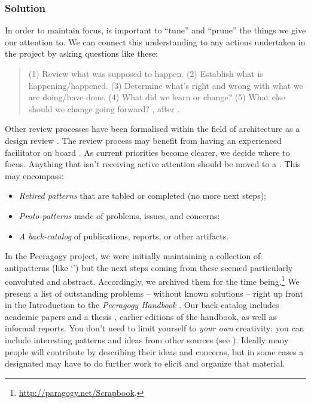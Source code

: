 \subsubsection*{Solution}
In order to maintain focus, is important to ``tune'' and ``prune'' the
things we give our attention to.  We can connect this understanding to
any actions undertaken in the project by asking questions like these:
\begin{quote}
(1) Review what was supposed to happen.
(2) Establish what is happening/happened.
(3) Determine what’s right and wrong with what we are doing/have done.
(4) What did we learn or change? 
(5) What else should we change going forward?  \cite[Chapter 28]{peeragogy-handbook}, after \cite{afteraction}.
\end{quote}
%
Other review processes have been formalised within the field of architecture
as a design review \cite{design-review}.  The review process may benefit from having an experienced
facilitator on board \cite[pp.~67, 142--143]{gabriel2002writer}.
As current priorities become clearer, we decide where to focus.
Anything that isn't receiving active attention should be moved to a
.  This may encompass:
\begin{itemize}
\item \emph{Retired patterns} that are tabled or completed (no more next steps);
\item \emph{Proto-patterns} made of problems, issues, and concerns;
\item \emph{A back-catalog} of publications, reports, or other
  artifacts.
\end{itemize}
In the Peeragogy project, we were initially maintaining a collection
of antipatterns (like `') but the
next steps coming from these seemed particularly convoluted and
abstract.  Accordingly, we archived them for the time
being.\footnote{\url{http://paragogy.net/Scrapbook}.}  We present a
list of outstanding problems -- without known solutions -- right up
front in the Introduction to the \emph{Peeragogy Handbook}
\cite[Chapter 1]{peeragogy-handbook}.  Our back-catalog includes
academic papers
\cite{building-peeragogy-accelerator,corneli2013inaction,corneli2012paragogical,paragogy-okcon}
and a thesis \cite{corneli-thesis}, earlier editions of the handbook,
as well as informal reports.
%
You don't need to limit
yourself to \emph{your own} creativity: you can include interesting
patterns and ideas from other sources (see ). Ideally many people will contribute by describing their
ideas and concerns, but in some cases a designated
 may have to do further work to elicit and
organize that material.

